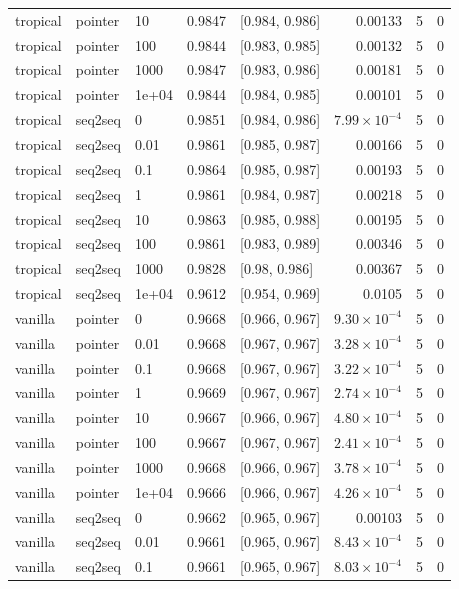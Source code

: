 \documentclass[10pt]{article}
\begin{document}
{\begin{longtable}{lllrlrrr}
tropical & pointer & 10 & 0.9847 & [0.984, 0.986] & 0.00133 & 5 & 0\\
tropical & pointer & 100 & 0.9844 & [0.983, 0.985] & 0.00132 & 5 & 0\\
tropical & pointer & 1000 & 0.9847 & [0.983, 0.986] & 0.00181 & 5 & 0\\
tropical & pointer & 1e+04 & 0.9844 & [0.984, 0.985] & 0.00101 & 5 & 0\\
tropical & seq2seq & 0 & 0.9851 & [0.984, 0.986] & $7.99\times10^{-4}$ & 5 & 0\\
tropical & seq2seq & 0.01 & 0.9861 & [0.985, 0.987] & 0.00166 & 5 & 0\\
tropical & seq2seq & 0.1 & 0.9864 & [0.985, 0.987] & 0.00193 & 5 & 0\\
tropical & seq2seq & 1 & 0.9861 & [0.984, 0.987] & 0.00218 & 5 & 0\\
tropical & seq2seq & 10 & 0.9863 & [0.985, 0.988] & 0.00195 & 5 & 0\\
tropical & seq2seq & 100 & 0.9861 & [0.983, 0.989] & 0.00346 & 5 & 0\\
tropical & seq2seq & 1000 & 0.9828 & [0.98, 0.986] & 0.00367 & 5 & 0\\
tropical & seq2seq & 1e+04 & 0.9612 & [0.954, 0.969] & 0.0105 & 5 & 0\\
vanilla & pointer & 0 & 0.9668 & [0.966, 0.967] & $9.30\times10^{-4}$ & 5 & 0\\
vanilla & pointer & 0.01 & 0.9668 & [0.967, 0.967] & $3.28\times10^{-4}$ & 5 & 0\\
vanilla & pointer & 0.1 & 0.9668 & [0.967, 0.967] & $3.22\times10^{-4}$ & 5 & 0\\
vanilla & pointer & 1 & 0.9669 & [0.967, 0.967] & $2.74\times10^{-4}$ & 5 & 0\\
vanilla & pointer & 10 & 0.9667 & [0.966, 0.967] & $4.80\times10^{-4}$ & 5 & 0\\
vanilla & pointer & 100 & 0.9667 & [0.967, 0.967] & $2.41\times10^{-4}$ & 5 & 0\\
vanilla & pointer & 1000 & 0.9668 & [0.966, 0.967] & $3.78\times10^{-4}$ & 5 & 0\\
vanilla & pointer & 1e+04 & 0.9666 & [0.966, 0.967] & $4.26\times10^{-4}$ & 5 & 0\\
vanilla & seq2seq & 0 & 0.9662 & [0.965, 0.967] & 0.00103 & 5 & 0\\
vanilla & seq2seq & 0.01 & 0.9661 & [0.965, 0.967] & $8.43\times10^{-4}$ & 5 & 0\\
vanilla & seq2seq & 0.1 & 0.9661 & [0.965, 0.967] & $8.03\times10^{-4}$ & 5 & 0\\

\end{longtable}}
\end{document}
